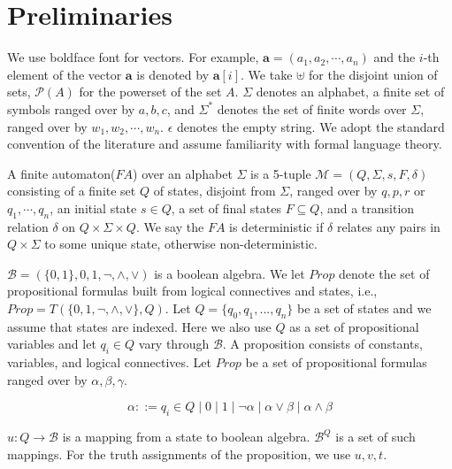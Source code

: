 \section{Preliminaries}

We use boldface font for vectors. For example, \( \mathbf{a} = (a_1, a_2,
\cdots, a_n) \) and the \( i \)-th element of the vector \( \mathbf{a} \) is
denoted by \( \mathbf{a}[i] \). We take \( \uplus \) for the disjoint union of
sets, \( \mathcal{P}(A) \) for the powerset of the set \( A \). \( \Sigma \)
denotes an alphabet, a finite set of symbols ranged over by \( a, b, c \), and
\( \Sigma^* \) denotes the set of finite words over \( \Sigma \), ranged over by
\( w_1, w_2, \cdots, w_n \). \( \epsilon \) denotes the empty string. We adopt
the standard convention of the literature\cite{Thomas:1997,tata2007} and assume
familiarity with formal language theory\cite{Kozen:1997}.

A finite automaton(\( \mathit{FA} \)) over an alphabet \( \Sigma \) is a 5-tuple
\( \mathcal{M} = (Q, \Sigma, s, F, \delta) \) consisting of a finite set \( Q \)
of states, disjoint from \( \Sigma \), ranged over by \( q, p, r \) or
\( q_1, \cdots , q_n \), an initial state \( s \in Q \), a set of final states
\( F \subseteq Q \), and a transition relation \( \delta \) on \( Q \times
\Sigma \times Q \). We say the \(\mathit{FA}\) is deterministic if \( \delta \)
relates any pairs in \( Q \times \Sigma \) to some unique state, otherwise
non-deterministic.

\( \mathcal{B} = (\{0, 1\}, 0, 1, \neg, \wedge, \vee) \) is a boolean
algebra. We let \( \mathit{Prop} \) denote the set of propositional formulas
built from logical connectives and states, i.e., \( \mathit{Prop} = T(\{ 0, 1,
\neg, \wedge, \vee \}, Q) \). Let \( Q = \{ q_0, q_1, ..., q_n \} \) be a set of
states and we assume that states are indexed.  Here we also use \( Q \) as a set
of propositional variables and let \( q_i \in Q \) vary through \( \mathcal{B}
\). A proposition consists of constants, variables, and logical connectives. Let
\( \mathit{Prop} \) be a set of propositional formulas ranged over by \( \alpha, \beta,
\gamma \).

\[
\alpha ::= q_i \in Q \mid 0 \mid 1
       \mid \neg \alpha \mid \alpha \vee \beta \mid \alpha \wedge \beta
\]

\( u : Q \rightarrow \mathcal{B} \) is a mapping from a state to boolean
algebra. \(\mathcal{B}^Q\) is a set of such mappings. For the truth assignments
of the proposition, we use \( u, v, t \).

